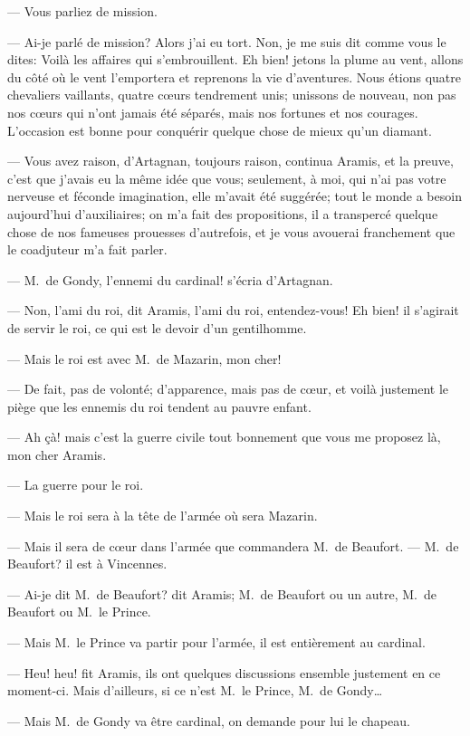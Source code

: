 — Vous parliez de mission.

— Ai-je parlé de mission? Alors j'ai eu tort. Non, je me suis dit comme vous le dites: Voilà les affaires qui s'embrouillent. Eh bien! jetons la plume au vent, allons du côté où le vent l'emportera et reprenons la vie d'aventures. Nous étions quatre chevaliers vaillants, quatre cœurs tendrement unis; unissons de nouveau, non pas nos cœurs qui n'ont jamais été séparés, mais nos fortunes et nos courages. L'occasion est bonne pour conquérir quelque chose de mieux qu'un diamant.

— Vous avez raison, d'Artagnan, toujours raison, continua Aramis, et la preuve, c'est que j'avais eu la même idée que vous; seulement, à moi, qui n'ai pas votre nerveuse et féconde imagination, elle m'avait été suggérée; tout le monde a besoin aujourd'hui d'auxiliaires; on m'a fait des propositions, il a transpercé quelque chose de nos fameuses prouesses d'autrefois, et je vous avouerai franchement que le coadjuteur m'a fait parler.

— M.~de Gondy, l'ennemi du cardinal! s'écria d'Artagnan.

— Non, l'ami du roi, dit Aramis, l'ami du roi, entendez-vous! Eh bien! il s'agirait de servir le roi, ce qui est le devoir d'un gentilhomme.

— Mais le roi est avec M.~de Mazarin, mon cher!

— De fait, pas de volonté; d'apparence, mais pas de cœur, et voilà justement le piège que les ennemis du roi tendent au pauvre enfant.

— Ah çà! mais c'est la guerre civile tout bonnement que vous me proposez là, mon cher Aramis.

— La guerre pour le roi.

— Mais le roi sera à la tête de l'armée où sera Mazarin.

— Mais il sera de cœur dans l'armée que commandera M.~de Beaufort.
— M.~de Beaufort? il est à Vincennes.

— Ai-je dit M.~de Beaufort? dit Aramis; M.~de Beaufort ou un autre, M.~de Beaufort ou M.~le Prince.

— Mais M.~le Prince va partir pour l'armée, il est entièrement au cardinal.

— Heu! heu! fit Aramis, ils ont quelques discussions ensemble justement en ce moment-ci. Mais d'ailleurs, si ce n'est M.~le Prince, M.~de Gondy\dots

— Mais M.~de Gondy va être cardinal, on demande pour lui le chapeau.

